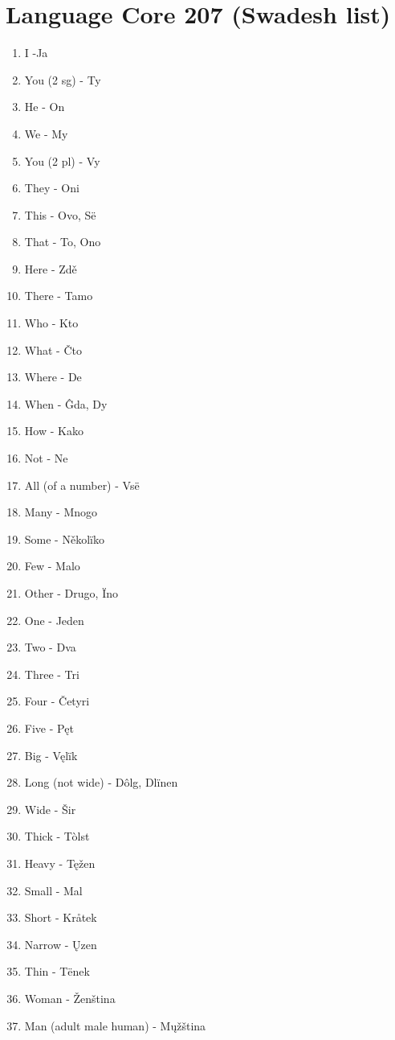 \section{Language Core 207 (Swadesh list)}

\begin{multicols}{2}
\begin{enumerate}
	\item I -Ja
	\item You (2 sg) - Ty
	\item He - On
	\item We - My
	\item You (2 pl) - Vy
	\item They - Oni
	\item This - Ovo, Së
	\item That - To, Ono
	\item Here - Zdě
	\item There - Tamo
	\item Who - Kto
	\item What - Čto
	\item Where - De
	\item When - Ĝda, Dy
	\item How - Kako
	\item Not - Ne
	\item All (of a number) - Vsë
	\item Many - Mnogo
	\item Some - Několïko
	\item Few - Malo
	\item Other - Drugo, Ïno
	\item One - Jeden
	\item Two - Dva
	\item Three - Tri
	\item Four - Četyri
	\item Five - Pęt
	\item Big - Vęlïk
	\item Long (not wide) - Dôlg, Dlïnen
	\item Wide - Šir
	\item Thick - Tòlst
	\item Heavy - Tęžen
	\item Small - Mal
	\item Short - Kråtek
	\item Narrow - Ųzen
	\item Thin - Tënek
	\item Woman - Ženština
	\item Man (adult male human) - Mųžština

\end{enumerate}
\end{multicols}
